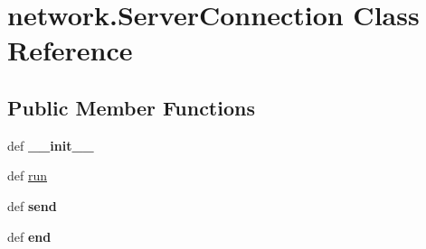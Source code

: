 \hypertarget{classnetwork_1_1_server_connection}{\section{network.\-Server\-Connection \-Class \-Reference}
\label{classnetwork_1_1_server_connection}
}
\subsection*{\-Public \-Member \-Functions}
\begin{DoxyCompactItemize}
\item 
\hypertarget{classnetwork_1_1_server_connection_a1818bbe7e2a0d4729ba76fafeecf90a0}{def {\bfseries \-\_\-\-\_\-init\-\_\-\-\_\-}}\label{classnetwork_1_1_server_connection_a1818bbe7e2a0d4729ba76fafeecf90a0}

\item 
def \hyperlink{classnetwork_1_1_server_connection_ab84090c243e9153e6fc06d545c4a8968}{run}
\item 
\hypertarget{classnetwork_1_1_server_connection_a6bcc6b09e3359518d050488c2269b28b}{def {\bfseries send}}\label{classnetwork_1_1_server_connection_a6bcc6b09e3359518d050488c2269b28b}

\item 
\hypertarget{classnetwork_1_1_server_connection_a113c3428c88f0a5b37bcc71d5252eaa2}{def {\bfseries end}}\label{classnetwork_1_1_server_connection_a113c3428c88f0a5b37bcc71d5252eaa2}

\end{DoxyCompactItemize}
